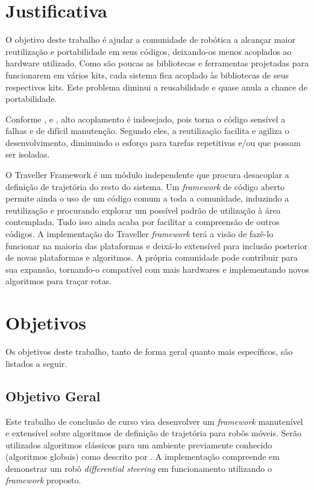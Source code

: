 \section{Justificativa}

O objetivo deste trabalho é ajudar a comunidade de robótica a alcançar maior reutilização e portabilidade em seus códigos, deixando-os menos acoplados ao hardware utilizado. Como são poucas as bibliotecas e ferramentas projetadas para funcionarem em vários kits, cada sistema fica acoplado às bibliotecas de seus respectivos kits. Este problema diminui a reusabilidade e quase anula a chance de portabilidade.

Conforme \cite{Larman2005}, \cite{Goodliffe2007} e \cite{McConnel2004}, alto acoplamento é indesejado, pois torna o código sensível a falhas e de difícil manutenção. Segundo eles, a reutilização facilita e agiliza o desenvolvimento, diminuindo o esforço para tarefas repetitivas e/ou que possam ser isoladas.

O Traveller Framework é um módulo independente que procura desacoplar a definição de trajetória do resto do sistema. Um \textit{framework} de código aberto permite ainda o uso de um código comum a toda a comunidade, induzindo a reutilização e procurando explorar um possível padrão de utilização à área contemplada. Tudo isso ainda acaba por facilitar a compreensão de outros códigos. A implementação do Traveller \textit{framework} terá a visão de fazê-lo funcionar na maioria das plataformas e deixá-lo extensível para inclusão posterior de novas plataformas e algoritmos. A própria comunidade pode contribuir para sua expansão, tornando-o compatível com mais hardwares e implementando novos algoritmos para traçar rotas.

\section{Objetivos}

Os objetivos deste trabalho, tanto de forma geral quanto mais específicos, são listados a seguir.

\subsection{Objetivo Geral}

Este trabalho de conclusão de curso visa desenvolver um \textit{framework} manutenível e extensível sobre algoritmos de definição de trajetória para robôs móveis. Serão utilizados algoritmos clássicos para um ambiente previamente conhecido (algoritmos globais) como descrito por \cite{Guzman2008}. A implementação compreende em demonstrar um robô \textit{differential steering} em funcionamento utilizando o \textit{framework} proposto.

